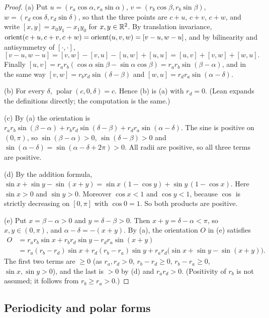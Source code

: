 \begin{proof}
(a) Put $u=(r_a\cos\alpha,r_a\sin\alpha)$, $v=(r_b\cos\beta,r_b\sin\beta)$, $w=(r_d\cos\delta,r_d\sin\delta)$,
so that the three points are $c+u$, $c+v$, $c+w$, and write $[x,y]=x_0y_1-x_1y_0$ for $x,y\in\mathbb R^2$. By
translation invariance, $\operatorname{orient}(c+u,c+v,c+w)=\operatorname{orient}(u,v,w)=[v-u,w-u]$, and by bilinearity and antisymmetry of
$[\cdot,\cdot]$,
\[
  [v-u,w-u]=[v,w]-[v,u]-[u,w]+[u,u]=[u,v]+[v,w]+[w,u].
\]
Finally $[u,v]=r_ar_b(\cos\alpha\sin\beta-\sin\alpha\cos\beta)=r_ar_b\sin(\beta-\alpha)$, and in the same way
$[v,w]=r_br_d\sin(\delta-\beta)$ and $[w,u]=r_dr_a\sin(\alpha-\delta)$.

(b) For every $\delta$, $\operatorname{polar}(c,0,\delta)=c$. Hence (b) is (a) with $r_d=0$. (Lean expands the
definitions directly; the computation is the same.)

(c) By (a) the orientation is $r_ar_b\sin(\beta-\alpha)+r_br_d\sin(\delta-\beta)+r_dr_a\sin(\alpha-\delta)$. The
sine is positive on $(0,\pi)$, so $\sin(\beta-\alpha)>0$, $\sin(\delta-\beta)>0$ and
$\sin(\alpha-\delta)=\sin(\alpha-\delta+2\pi)>0$. All radii are positive, so all three terms are positive.

(d) By the addition formula, $\sin x+\sin y-\sin(x+y)=\sin x\,(1-\cos y)+\sin y\,(1-\cos x)$. Here $\sin x>0$
and $\sin y>0$. Moreover $\cos x<1$ and $\cos y<1$, because $\cos$ is strictly decreasing on $[0,\pi]$ with
$\cos 0=1$. So both products are positive.

(e) Put $x=\beta-\alpha>0$ and $y=\delta-\beta>0$. Then $x+y=\delta-\alpha<\pi$, so $x,y\in(0,\pi)$, and
$\alpha-\delta=-(x+y)$. By (a), the orientation $O$ in (e) satisfies
\begin{align*}
  O&=r_ar_b\sin x+r_br_d\sin y-r_dr_a\sin(x+y)\\
   &=r_a(r_b-r_d)\sin x+r_d(r_b-r_a)\sin y+r_ar_d\bigl(\sin x+\sin y-\sin(x+y)\bigr).
\end{align*}
The first two terms are $\ge0$ (as $r_a,r_d>0$, $r_b-r_d\ge0$, $r_b-r_a\ge0$, $\sin x,\sin y>0$), and the last
is $>0$ by (d) and $r_ar_d>0$. (Positivity of $r_b$ is not assumed; it follows from $r_b\ge r_a>0$.)
\end{proof}

\subsection{Periodicity and polar forms}

